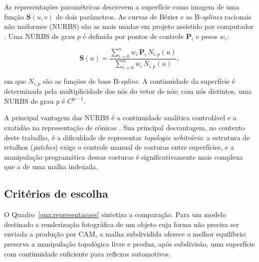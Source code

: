 As representa\c{c}\~oes param\'etricas descrevem a superf\'icie como imagem de uma fun\c{c}\~ao
$\mathbf{S}(u,v)$ de dois par\^ametros. As curvas de B\'ezier e as B-\emph{splines} racionais
n\~ao uniformes (NURBS) s\~ao as mais usadas em projeto assistido por computador \cite{piegl1997,
farin2002}. Uma NURBS de grau $p$ \'e definida por pontos de controle $\mathbf{P}_i$ e pesos
$w_i$:

\begin{equation}
\mathbf{S}(u) = \frac{\sum_{i=0}^{n} w_i\, \mathbf{P}_i\, N_{i,p}(u)}{\sum_{i=0}^{n} w_i\, N_{i,p}(u)},
\label{eq:nurbs}
\end{equation}

\noindent em que $N_{i,p}$ s\~ao as fun\c{c}\~oes de base B-\emph{spline}. A continuidade da
superf\'icie \'e determinada pela multiplicidade dos n\'os do vetor de n\'os: com n\'os
distintos, uma NURBS de grau $p$ \'e $C^{p-1}$.

A principal vantagem das NURBS \'e a continuidade anal\'itica control\'avel e a exatid\~ao na
representa\c{c}\~ao de c\^onicas \cite{mortenson1997}. Sua principal desvantagem, no contexto
deste trabalho, \'e a dificuldade de representar \emph{topologia arbitr\'aria}: a estrutura de
retalhos (\emph{patches}) exige o controle manual de costuras entre superf\'icies, e a
manipula\c{c}\~ao program\'atica dessas costuras \'e significativamente mais complexa que a de uma
malha indexada.

\subsection{Crit\'erios de escolha}

O Quadro~\ref{qua:representacoes} sintetiza a compara\c{c}\~ao. Para um modelo destinado a
renderiza\c{c}\~ao fotogr\'afica de um objeto cuja forma n\~ao precisa ser enviada a produ\c{c}\~ao
por CAM, a malha subdividida oferece o melhor equil\'ibrio: preserva a manipula\c{c}\~ao
topol\'ogica livre e produz, ap\'os subdivis\~ao, uma superf\'icie com continuidade suficiente
para reflexos automotivos.

